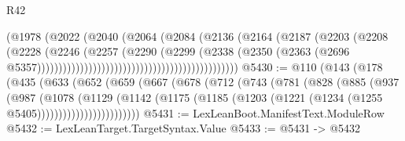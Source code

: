 \begin{lexlean}{R42}
\begin{coremodule}
                                                            (@1978
                                                              (@2022
                                                                (@2040
                                                                  (@2064
                                                                    (@2084
                                                                      (@2136
                                                                        (@2164
                                                                          (@2187
                                                                            (@2203
                                                                              (@2208
                                                                                (@2228
                                                                                  (@2246
                                                                                    (@2257
                                                                                      (@2290
                                                                                        (@2299
                                                                                          (@2338
                                                                                            (@2350
                                                                                              (@2363
                                                                                                (@2696
                                                                                                  @5357)))))))))))))))))))))))))))))))))))))))))))))))
@5430 := @110
    (@143
      (@178
        (@435
          (@633
            (@652
              (@659
                (@667
                  (@678
                    (@712
                      (@743
                        (@781
                          (@828
                            (@885
                              (@937
                                (@987
                                  (@1078
                                    (@1129
                                      (@1142
                                        (@1175
                                          (@1185
                                            (@1203
                                              (@1221 (@1234 (@1255 @5405))))))))))))))))))))))))
@5431 := LexLeanBoot.ManifestText.ModuleRow
@5432 := LexLeanTarget.TargetSyntax.Value
@5433 := @5431 -> @5432

\end{coremodule}
\end{lexlean}

